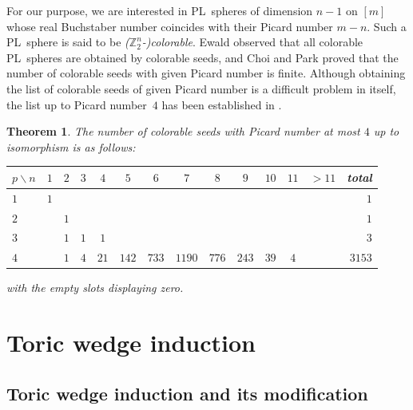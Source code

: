 \documentclass[11pt]{amsart}
\theoremstyle{plain}
\newtheorem{theorem}{Theorem}[section]
\numberwithin{equation}{section}
\theoremstyle{definition}
\newcommand{\Z}{\mathbb{Z}}
\begin{document}
For our purpose, we are interested in PL~spheres of dimension $n-1$ on $[m]$ whose real Buchstaber number coincides with their Picard number $m-n$.
Such a PL~sphere is said to be \emph{($\Z_2^n$-)colorable}.
Ewald \cite{ewald1996combinatorial} observed that all colorable PL~spheres are obtained by colorable seeds, and Choi and Park \cite{CP_wedge_2} proved that the number of colorable seeds with given Picard number is finite.
Although obtaining the list of colorable seeds of given Picard number is a difficult problem in itself, the list up to Picard number~$4$ has been established in \cite{Choi-Jang-Vallee2023}.

\begin{theorem} \cite{Choi-Jang-Vallee2023} \label{theorem: classification}
    The number of colorable seeds with Picard number at most $4$ up to isomorphism is as follows:
    \begin{center}
        \begin{tabular}{l*{12}{c}r}
        \toprule
        $p\backslash n$ &$1$ & $2$ & $3$ & $4$ & $5$ & $6$ & $7$ & $8$ & $9$ & $10$ & $11$ & $>11$& total \tabularnewline \midrule
        $1$&$1$&  &&&&&&&&&&&$1$\tabularnewline
        $2$ && $1$ & & &&&&&&&&& $1$\tabularnewline
        $3$ && $1$ & $1$& $1$& & & & &&&& &$3$\tabularnewline
        $4$ && $1$ & $4$ & $21$ & $142$ & $733$ & $1190$ & $776$ & $243$& $39$ & $4$ & &$3153$\tabularnewline
        \bottomrule
        \end{tabular}
    \end{center}
    with the empty slots displaying zero.
\end{theorem}



\section{Toric wedge induction}
\subsection{Toric wedge induction and its modification}
\end{document}
